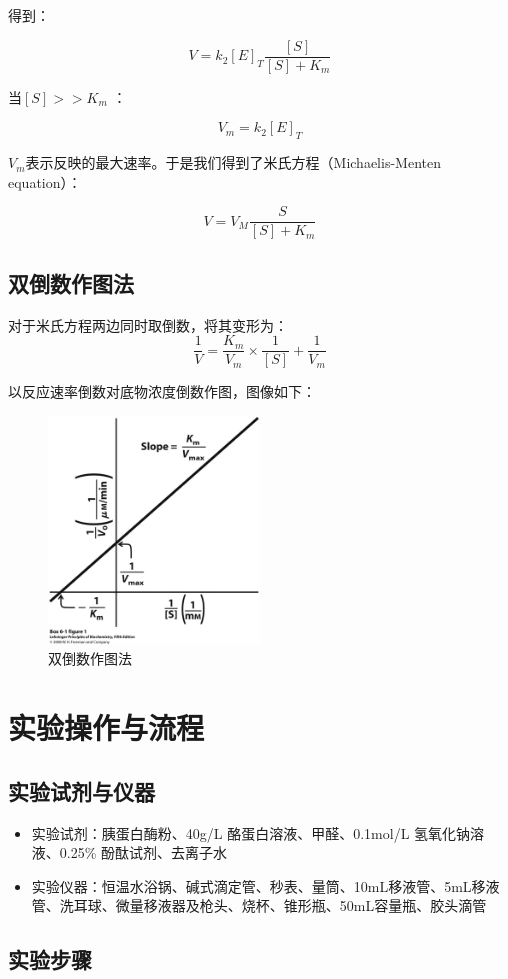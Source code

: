 \documentclass[UTF8]{ctexart}
\begin{document}
	得到：
	
	\[V=k_2[E]_T \frac{[S]}{[S]+K_m}\]
	
	当$[S] >> K_m$ ：
	
	\[V_m=k_2[E]_T\]
	
	$V_m$表示反映的最大速率。于是我们得到了米氏方程（Michaelis-Menten equation）：
	
	\[V=V_M \frac{S}{[S]+K_m}\]
	\subsection{双倒数作图法}
	对于米氏方程两边同时取倒数，将其变形为：
	\[\frac{1}{V} = \frac{K_m}{V_m} \times \frac{1}{[S]} + \frac{1}{V_m}\]
	
	以反应速率倒数对底物浓度倒数作图，图像如下：
	
	\begin{figure}[H]
		\centering
		\includegraphics[width=0.5\textwidth]{1.png}
		\caption{双倒数作图法}
		\label{fig:example}
	\end{figure}
	\section{实验操作与流程}
	\subsection{实验试剂与仪器}
	\begin{itemize}
		\item 实验试剂：胰蛋白酶粉、40g/L 酪蛋白溶液、甲醛、0.1mol/L 氢氧化钠溶液、0.25\% 酚酞试剂、去离子水
		\item 实验仪器：恒温水浴锅、碱式滴定管、秒表、量筒、10mL移液管、5mL移液管、洗耳球、微量移液器及枪头、烧杯、锥形瓶、50mL容量瓶、胶头滴管
	\end{itemize}
	\subsection{实验步骤}
\end{document}
